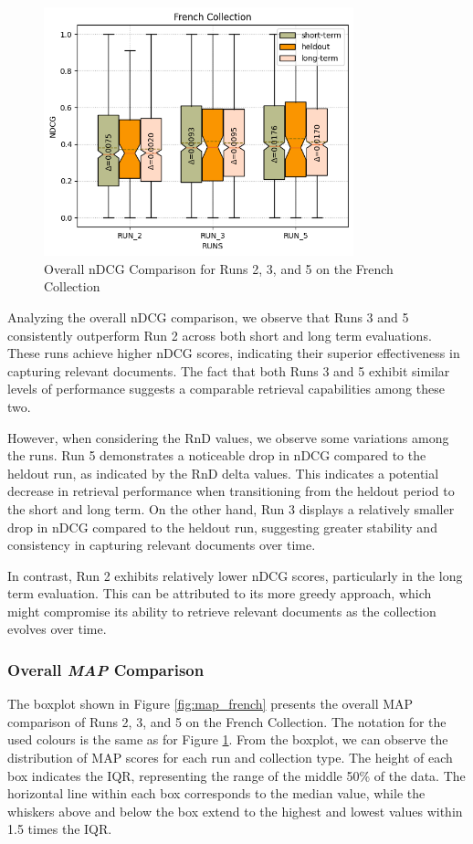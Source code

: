 \begin{figure}[!h]
\centering
\includegraphics[width=0.8\textwidth]{figure/StatisticalAnalysis/BoxPlot/NDGC French.png}
\caption{Overall \ac{nDCG} Comparison for Runs 2, 3, and 5 on the French Collection}
\label{fig:overall_ndcg_french_boxplot}
\end{figure}

Analyzing the overall \ac{nDCG} comparison, we observe that Runs 3 and 5 consistently outperform Run 2 across both short and long term evaluations. 
These runs achieve higher \ac{nDCG} scores, indicating their superior effectiveness in capturing relevant documents. 
The fact that both Runs 3 and 5 exhibit similar levels of performance suggests a comparable retrieval capabilities among these two.

However, when considering the \ac{RnD} values, we observe some variations among the runs. 
Run 5 demonstrates a noticeable drop in \ac{nDCG} compared to the heldout run, as indicated by the \ac{RnD} delta values. 
This indicates a potential decrease in retrieval performance when transitioning from the heldout period to the short and long term. 
On the other hand, Run 3 displays a relatively smaller drop in \ac{nDCG} compared to the heldout run, suggesting greater stability and consistency in capturing relevant documents over time.

In contrast, Run 2 exhibits relatively lower \ac{nDCG} scores, particularly in the long term evaluation. This can be attributed to its more greedy approach, which might compromise its ability to retrieve relevant documents as the collection evolves over time.

\newpage
\subsubsection{Overall \textit{MAP} Comparison}
The boxplot shown in Figure \ref{fig:map_french} presents the overall \ac{MAP} comparison of Runs 2, 3, and 5 on the French Collection.
The notation for the used colours is the same as for Figure \ref{fig:overall_ndcg_french_boxplot}.
From the boxplot, we can observe the distribution of MAP scores for each run and collection type. The height of each box indicates the \ac{IQR}, representing the range of the middle 50\% of the data. 
The horizontal line within each box corresponds to the median value, while the whiskers above and below the box extend to the highest and lowest values within 1.5 times the \ac{IQR}.

